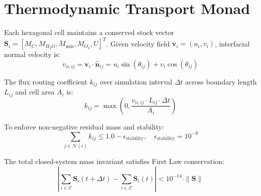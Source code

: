 \documentclass[11pt,a4paper]{article}
\begin{document}
\section{Thermodynamic Transport Monad}
Each hexagonal cell maintains a conserved stock vector $\mathbf{S}_i = [M_C, M_{H_2O}, M_{\text{min}}, M_{O_2}, U]^T$. Given velocity field $\mathbf{v}_i = (u_i, v_i)$, interfacial normal velocity is:
\begin{equation}
v_{n, ij} = \mathbf{v}_i \cdot \hat{\mathbf{n}}_{ij} = u_i \sin(\theta_{ij}) + v_i \cos(\theta_{ij})
\end{equation}

The flux routing coefficient $k_{ij}$ over simulation interval $\Delta t$ across boundary length $L_{ij}$ and cell area $A_i$ is:
\begin{equation}
k_{ij} = \max\left(0, \frac{v_{n, ij} \cdot L_{ij} \cdot \Delta t}{A_i}\right)
\end{equation}

To enforce non-negative residual mass and stability:
\begin{equation}
\sum_{j \in \mathcal{N}(i)} k_{ij} \le 1.0 - \epsilon_{\text{stability}}, \quad \epsilon_{\text{stability}} = 10^{-9}
\end{equation}

The total closed-system mass invariant satisfies First Law conservation:
\begin{equation}
\left| \sum_{i \in \mathcal{C}} \mathbf{S}_i(t + \Delta t) - \sum_{i \in \mathcal{C}} \mathbf{S}_i(t) \right| < 10^{-14} \cdot \|\mathbf{S}\|
\end{equation}
\end{document}
